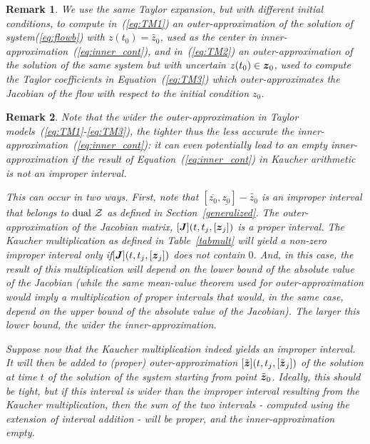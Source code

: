 \documentclass{sig-alternate-05-2015} %
\newcommand{\dual}{\mbox{dual }}
\newtheorem{remark}{Remark}
\begin{document}
\begin{remark}
We use the same Taylor expansion, but with different initial conditions, to compute in~(\ref{eq:TM1}) an outer-approximation of the solution of system(\ref{eq:flowb}) 
with $z(t_0)=\tilde{z_0}$, used as the center in inner-approximation~(\ref{eq:inner_cont}), and  in~(\ref{eq:TM2}) an outer-approximation of the solution of the 
same system but with uncertain $z(t_0) \in \z_0$, used to compute the Taylor coefficients in Equation~(\ref{eq:TM3}) which outer-approximates the Jacobian of the flow 
with respect to the initial condition $z_0$. 
\end{remark}

\begin{remark}
Note that the wider the outer-approximation in Taylor models~(\ref{eq:TM1}-\ref{eq:TM3}), the tighter thus the less accurate the inner-approximation~(\ref{eq:inner_cont}): 
it can even potentially lead to an empty inner-approximation if the result of Equation~(\ref{eq:inner_cont}) in Kaucher arithmetic is not an improper interval. 

This can occur in two ways. First, note that $[\overline{z_0},\underline{z_0}]-\tilde{z_0}$ is an improper interval that belongs to $\dual {\cal Z}$ as defined 
in Section~\ref{generalized}. The outer-approximation of the Jacobian matrix,  $[\J](t,t_j,[{\z}_j])$ is a proper interval. The Kaucher multiplication as defined in Table~\ref{tabmult}
will yield a non-zero improper interval only if$[\J](t,t_j,[{\z}_j])$ does not contain $0$. And, in this case, the result of this multiplication will depend on the 
lower bound of the absolute value of the Jacobian (while the same mean-value theorem used for outer-approximation would imply a multiplication of proper intervals that would, 
in the same case, depend on the upper bound of the absolute value of the Jacobian). The larger this lower bound, the wider the inner-approximation. 

Suppose now that the Kaucher multiplication indeed yields an improper interval. It will then be added to (proper) outer-approximation  $[\tilde{\z}](t,t_j,[\tilde{\z}_j])$ 
of the solution at time $t$ of the solution of the system starting from point $\tilde{\z}_0$. Ideally, this should be tight, but if this interval is wider than the improper 
interval resulting from the Kaucher multiplication, then the sum of the two intervals - computed using the extension of interval addition - will be proper, 
and the inner-approximation empty. 
\end{remark}
\end{document}
